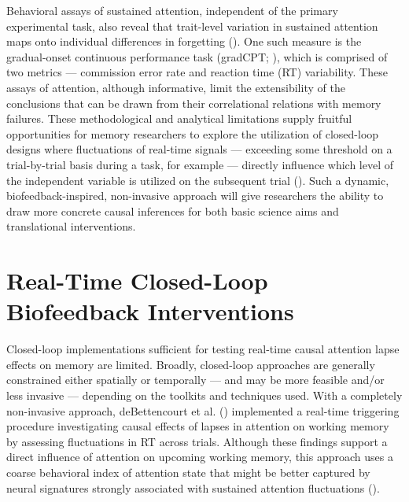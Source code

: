 Behavioral assays of sustained attention, independent of the primary experimental task, also reveal that trait-level variation in sustained attention maps onto individual differences in forgetting (\cite{madore2020memory}). One such measure is the  gradual-onset continuous performance task (gradCPT; \cite{esterman2013zone, rosenberg2013sustaining}), which is comprised of two metrics --- commission error rate and reaction time (RT) variability. These assays of attention, although informative, limit the extensibility of the conclusions that can be drawn from their correlational relations with memory failures. These methodological and analytical limitations supply fruitful opportunities for memory researchers to explore the utilization of closed-loop designs where fluctuations of real-time signals --- exceeding some threshold on a trial-by-trial basis during a task, for example --- directly influence which level of the independent variable is utilized on the subsequent trial (\cite{laconte2011decoding}). Such a dynamic, biofeedback-inspired, non-invasive approach will give researchers the ability to draw more concrete causal inferences for both basic science aims and translational interventions.

\section{Real-Time Closed-Loop Biofeedback Interventions}
Closed-loop implementations sufficient for testing real-time causal attention lapse effects on memory are limited. Broadly, closed-loop approaches are generally constrained either spatially or temporally --- and may be more feasible and/or less invasive --- depending on the toolkits and techniques used. With a completely non-invasive approach, deBettencourt et al. (\cite*{debettencourt2019real}) implemented a real-time triggering procedure investigating causal effects of lapses in attention on working memory by assessing fluctuations in RT across trials. Although these findings support a direct influence of attention on upcoming working memory, this approach uses a coarse behavioral index of attention state that might be better captured by neural signatures strongly associated with sustained attention fluctuations (\cite{murray2011markers, myers2014oscillatory, adam2015contribution, giesbrecht2006pre, debettencourt2019real}).

